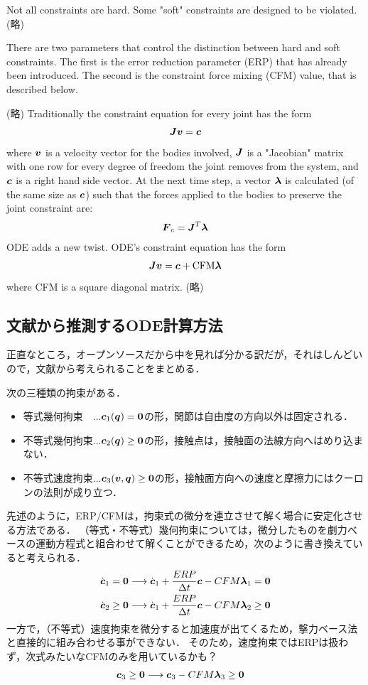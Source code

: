\documentclass{jsarticle}
\begin{document}
Not all constraints are hard. Some "soft" constraints are designed to be violated. (略)

There are two parameters that control the distinction between hard and soft constraints. The first is the error reduction parameter (ERP) that has already been introduced. The second is the constraint force mixing (CFM) value, that is described below.

(略)
Traditionally the constraint equation for every joint has the form
\begin{align*}
\mbox{\boldmath $J$}\mbox{\boldmath $v$} = \mbox{\boldmath $c$}
\end{align*}
where $\mbox{\boldmath $v$}$ is a velocity vector for the bodies involved, $\mbox{\boldmath $J$}$ is a "Jacobian" matrix with one row for every degree of freedom the joint removes from the system, and $\mbox{\boldmath $c$}$ is a right hand side vector. At the next time step, a vector $\mbox{\boldmath $\lambda$}$ is calculated (of the same size as $\mbox{\boldmath $c$}$) such that the forces applied to the bodies to preserve the joint constraint are:
\begin{align*}
\mbox{\boldmath $F$}_c = \mbox{\boldmath $J$}^T \mbox{\boldmath $\lambda$}
\end{align*}
ODE adds a new twist. ODE's constraint equation has the form
\begin{align*}
\mbox{\boldmath $J$} \mbox{\boldmath $v$} = \mbox{\boldmath $c$} + \mbox{CFM}\mbox{\boldmath $\lambda$}
\end{align*}
where CFM is a square diagonal matrix.
(略)


\subsection{文献から推測するODE計算方法}
正直なところ，オープンソースだから中を見れば分かる訳だが，それはしんどいので，文献から考えられることをまとめる．

次の三種類の拘束がある．
\begin{itemize}
 \item 等式幾何拘束　...$\mbox{\boldmath $c$}_1(\mbox{\boldmath $q$})=\mbox{\bf 0}$の形，関節は自由度の方向以外は固定される．
 \item 不等式幾何拘束...$\mbox{\boldmath $c$}_2(\mbox{\boldmath $q$})\ge\mbox{\bf 0}$の形，接触点は，接触面の法線方向へはめり込まない．
 \item 不等式速度拘束...$\mbox{\boldmath $c$}_3(\mbox{\boldmath $v$},\mbox{\boldmath $q$})\ge\mbox{\bf 0}$の形，接触面方向への速度と摩擦力にはクーロンの法則が成り立つ．
\end{itemize}
先述のように，ERP/CFMは，拘束式の微分を連立させて解く場合に安定化させる方法である．
（等式・不等式）幾何拘束については，微分したものを劇力ベースの運動方程式と組合わせて解くことができるため，次のように書き換えていると考えられる．
\begin{align*}
 \dot{\mbox{\boldmath $c$}}_1=\mbox{\bf 0}   &\longrightarrow \dot{\mbox{\boldmath $c$}}_1+\frac{ERP}{\Delta t}\mbox{\boldmath $c$} - CFM\mbox{\boldmath $\lambda$}_1 =\mbox{\bf 0}\\
 \dot{\mbox{\boldmath $c$}}_2\ge\mbox{\bf 0} &\longrightarrow \dot{\mbox{\boldmath $c$}}_1+\frac{ERP}{\Delta t}\mbox{\boldmath $c$} - CFM\mbox{\boldmath $\lambda$}_2 \ge\mbox{\bf 0}
\end{align*}
一方で，（不等式）速度拘束を微分すると加速度が出てくるため，撃力ベース法と直接的に組み合わせる事ができない．
そのため，速度拘束ではERPは扱わず，次式みたいなCFMのみを用いているかも？
\begin{align*}
 \mbox{\boldmath $c$}_3\ge\mbox{\bf 0} &\longrightarrow \mbox{\boldmath $c$}_3 - CFM\mbox{\boldmath $\lambda$}_3\ge\mbox{\bf 0}
\end{align*}



\end{document}
